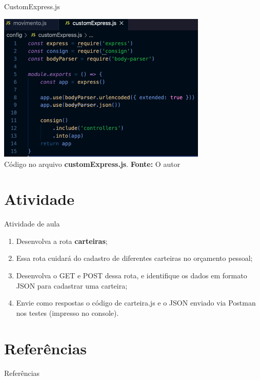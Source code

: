 \documentclass{beamer}
\begin{document}
    \begin{frame}{CustomExpress.js}
         \begin{center}
    	\includegraphics[width=100mm]{resources/aula5_3.png}\\
        \tiny{ Código no arquivo \textbf{customExpress.js}. \textbf{Fonte:} O autor}
     \end{center}   
    \end{frame}
  \section{Atividade}
  \begin{frame}{Atividade de aula}
   \begin{enumerate}
     \item Desenvolva a rota \textbf{carteiras};
     \item Essa rota cuidará do cadastro de diferentes carteiras no orçamento pessoal;
     \item Desenvolva o GET  e POST dessa rota, e identifique os dados em formato JSON para cadastrar uma carteira; 
     \item Envie como respostas o código de carteira.js e o JSON enviado via Postman nos testes (impresso no console).
   \end{enumerate}
  \end{frame}

\section{Referências}
\begin{frame}{Referências}%
\small
\begin{center}
\tiny


\end{center}
\end{frame}
  
\end{document}
